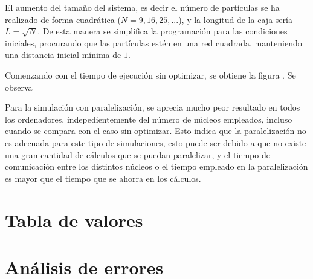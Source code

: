 \documentclass[11pt, twoside]{article} %
\begin{document}
El aumento del tamaño del sistema, es decir el número de partículas se ha realizado
de forma cuadrática ($N = 9, 16, 25, ...$), y la longitud de la caja sería $L = \sqrt{N}$.
De esta manera se simplifica la programación para las condiciones iniciales, procurando
que las partículas estén en una red cuadrada, manteniendo una distancia inicial mínima 
de $1$.

Comenzando con el tiempo de ejecución sin optimizar, se obtiene la figura . Se observa 



Para la simulación con paralelización, se aprecia mucho peor resultado en todos los ordenadores,
indepedientemente del número de núcleos empleados, incluso cuando se compara con el caso sin 
optimizar. Esto indica que la paralelización no es adecuada para este tipo de simulaciones, esto 
puede ser debido a que no existe una gran cantidad de cálculos que se puedan paralelizar, y el 
tiempo de comunicación entre los distintos núcleos o el tiempo empleado en la paralelización
es mayor que el tiempo que se ahorra en los cálculos.
\newpage

\appendix

\section{Tabla de valores}


\newpage

\section{Análisis de errores}
\end{document}
